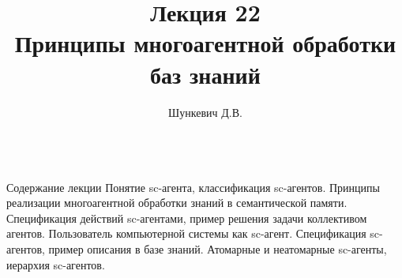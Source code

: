 \title{Лекция 22\\Принципы многоагентной обработки баз знаний}
\author[]{Шункевич Д.В.}

\begin{frame}
	\titlepage
\end{frame}

\begin{frame}{\\Содержание лекции}
	\topline
	\justifying
	Понятие sc-агента, классификация sc-агентов. Принципы реализации многоагентной обработки знаний в семантической памяти. Спецификация действий sc-агентами, пример решения задачи коллективом агентов. Пользователь компьютерной системы как sc-агент. Спецификация sc-агентов, пример описания в базе знаний. Атомарные и неатомарные sc-агенты, иерархия sc-агентов.
\end{frame}

